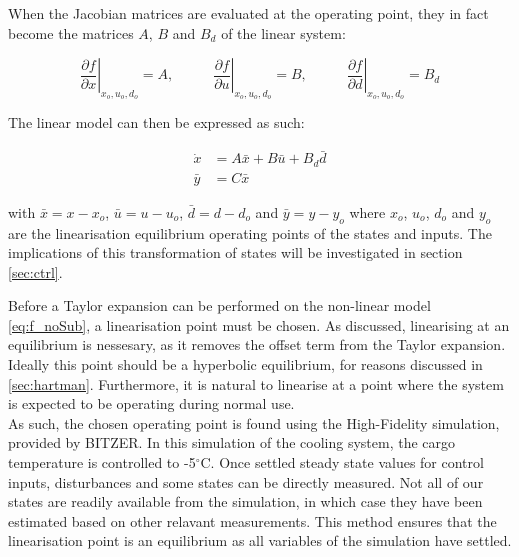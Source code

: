 When the Jacobian matrices are evaluated at the operating point, they in fact become the matrices $ A $, $ B $ and $ B_d  $ of the linear system:

\begin{equation}
	\left. \dfrac{\partial f}{\partial x} \right |_{x_o, u_o, d_o} = A, \;\;\;\;\;\;\;\;\;\;
	\left. \dfrac{\partial f}{\partial u} \right |_{x_o, u_o, d_o} = B, \;\;\;\;\;\;\;\;\;\;
	\left. \dfrac{\partial f}{\partial d} \right |_{x_o, u_o, d_o} = B_d
\end{equation}

The linear model can then be expressed as such:

\begin{equation} \label{eq:state_space_linear}
	\begin{split}
		\dot{x} & = A\bar{x} + B\bar{u} + B_d\bar{d} \\
		\bar{y} & = C\bar{x}
	\end{split}
\end{equation}

with $\bar{x} = x-x_o$, $\bar{u} = u-u_o$, $\bar{d} = d-d_o$ and $\bar{y} = y-y_o$ where $x_o$, $u_o$, $d_o$ and $y_o$ are the linearisation equilibrium operating points of the states and inputs. The implications of this transformation of states will be investigated in section \cref{sec:ctrl}.

Before a Taylor expansion can be performed on the non-linear model \cref{eq:f_noSub}, a linearisation point must be chosen. As discussed, linearising at an equilibrium is nessesary, as it removes the offset term from the Taylor expansion. Ideally this point should be a hyperbolic equilibrium, for reasons discussed in \cref{sec:hartman}. Furthermore, it is natural to linearise at a point where the system is expected to be operating during normal use. \\

As such, the chosen operating point is found using the High-Fidelity simulation, provided by BITZER. In this simulation of the cooling system, the cargo temperature is controlled to -5$^{\circ}$C. Once settled steady state values for control inputs, disturbances and some states can be directly measured. Not all of our states are readily available from the simulation, in which case they have been estimated based on other relavant measurements. This method ensures that the linearisation point is an equilibrium as all variables of the simulation have settled.\\



